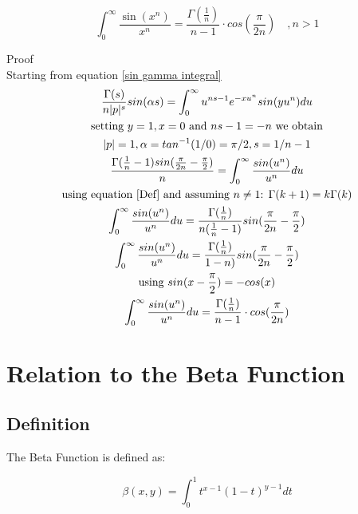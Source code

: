 \documentclass[a4paper]{article}
\begin{document}
\begin{theorem}
\begin{equation}
\boxed{
\int_{0}^{\infty} \frac{\sin(x^n)}{x^n} = \frac{\Gamma(\frac{1}{n})}{n-1} \cdot cos(\frac{\pi}{2n})
\quad ,   n > 1
}
\end{equation}

Proof
\\
Starting from equation \ref{sin gamma integral}
\begin{gather*}
\frac{\Gamma(s)}{n |p|^s} sin(\alpha s)= \int_{0}^{\infty} u^{ns -1} e^{-x u^{n}} sin(y u^n) du
\\
\text{setting $y=1, x=0$ and $ns -1 = -n$ we obtain}
\\
|p| = 1, \alpha = tan^{-1}(1/0) = \pi/2, s = 1/n -1
\\
\frac{\Gamma(\frac{1}{n} - 1) sin(\frac{\pi}{2n} - \frac{\pi}{2})}{n} = \int_{0}^{\infty} \frac{sin(u^n)}{u^n} du
\\
\text{using equation \ref{Def} and assuming $n \neq 1$: } \Gamma(k+1) = k \Gamma(k)
\\
\int_{0}^{\infty} \frac{sin(u^n)}{u^n} du = \frac{\Gamma(\frac{1}{n})}{n (\frac{1}{n} -1 ) }  sin(\frac{\pi}{2n} - \frac{\pi}{2})
\\
\int_{0}^{\infty} \frac{sin(u^n)}{u^n} du = \frac{\Gamma(\frac{1}{n})}{1 - n )}  sin(\frac{\pi}{2n} - \frac{\pi}{2})
\\
\text{using $sin(x - \frac{\pi}{2}) = - cos(x)$}
\\
\int_{0}^{\infty} \frac{sin(u^n)}{u^n} du = \frac{\Gamma(\frac{1}{n})}{n-1} \cdot cos(\frac{\pi}{2n})
\end{gather*}
\end{theorem}

\pagebreak

\section{Relation to the Beta Function}

\subsection{Definition}
The Beta Function is defined as:
\begin{definition} \label{beta def}
$$
\beta(x, y) = \int_{0}^{1} t^{x-1} (1-t)^{y-1} dt
$$
\end{definition}
\end{document}
